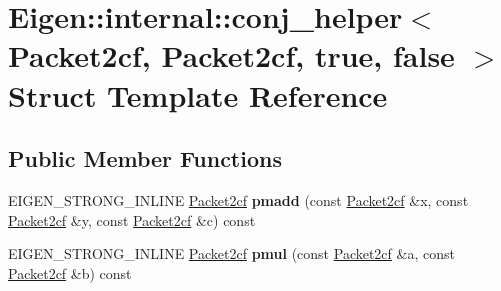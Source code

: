 \hypertarget{struct_eigen_1_1internal_1_1conj__helper_3_01_packet2cf_00_01_packet2cf_00_01true_00_01false_01_4}{}\section{Eigen\+::internal\+::conj\+\_\+helper$<$ Packet2cf, Packet2cf, true, false $>$ Struct Template Reference}
\label{struct_eigen_1_1internal_1_1conj__helper_3_01_packet2cf_00_01_packet2cf_00_01true_00_01false_01_4}
\subsection*{Public Member Functions}
\begin{DoxyCompactItemize}
\item 
\mbox{\label{struct_eigen_1_1internal_1_1conj__helper_3_01_packet2cf_00_01_packet2cf_00_01true_00_01false_01_4_adf96b24cdfcc9e3616d67c6f16da9920}} 
E\+I\+G\+E\+N\+\_\+\+S\+T\+R\+O\+N\+G\+\_\+\+I\+N\+L\+I\+NE \mbox{\hyperlink{struct_eigen_1_1internal_1_1_packet2cf}{Packet2cf}} {\bfseries pmadd} (const \mbox{\hyperlink{struct_eigen_1_1internal_1_1_packet2cf}{Packet2cf}} \&x, const \mbox{\hyperlink{struct_eigen_1_1internal_1_1_packet2cf}{Packet2cf}} \&y, const \mbox{\hyperlink{struct_eigen_1_1internal_1_1_packet2cf}{Packet2cf}} \&c) const
\item 
\mbox{\label{struct_eigen_1_1internal_1_1conj__helper_3_01_packet2cf_00_01_packet2cf_00_01true_00_01false_01_4_a09374613c0b962776ac245738c43f36b}} 
E\+I\+G\+E\+N\+\_\+\+S\+T\+R\+O\+N\+G\+\_\+\+I\+N\+L\+I\+NE \mbox{\hyperlink{struct_eigen_1_1internal_1_1_packet2cf}{Packet2cf}} {\bfseries pmul} (const \mbox{\hyperlink{struct_eigen_1_1internal_1_1_packet2cf}{Packet2cf}} \&a, const \mbox{\hyperlink{struct_eigen_1_1internal_1_1_packet2cf}{Packet2cf}} \&b) const
\item 
\mbox{\label{struct_eigen_1_1internal_1_1conj__helper_3_01_packet2cf_00_01_packet2cf_00_01true_00_01false_01_4_adf96b24cdfcc9e3616d67c6f16da9920}} 

\end{DoxyCompactItemize}
